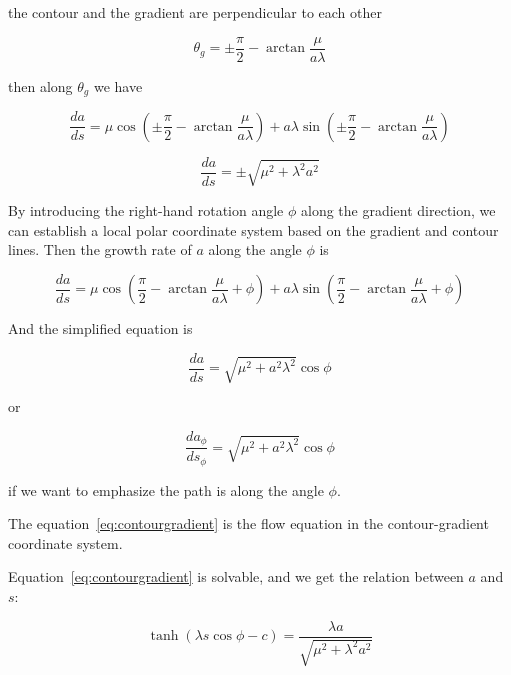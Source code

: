 \documentclass{article}
\numberwithin{definition}{section}
\numberwithin{lemma}{section}
\numberwithin{proposition}{section}
\numberwithin{corollary}{section}
\numberwithin{theorem}{section}
\begin{document}
the contour and the gradient are perpendicular to each other

\begin{equation}
    \theta_g = \pm \frac{\pi}{2} - \arctan \frac{\mu}{a \lambda}\label{eq:gradientangle}
\end{equation}

then along $\theta_g$ we have

\begin{equation}
    \frac{da}{ds} = \mu \cos (\pm \frac{\pi}{2} - \arctan \frac{\mu}{a \lambda}) + a \lambda \sin (\pm \frac{\pi}{2} - \arctan \frac{\mu}{a \lambda})
    \label{eq:alonggradient}
\end{equation}

\begin{equation}
    \frac{da}{ds} = \pm \sqrt{\mu^2 + \lambda^2 a^2}\label{eq:grad}
\end{equation}

By introducing the right-hand rotation angle $\phi$ along the gradient direction, we can establish a local polar coordinate system based on the gradient and contour lines.
Then the growth rate of $a$ along the angle $\phi$ is

\begin{equation}
    \frac{da}{ds} = \mu \cos (\frac{\pi}{2} - \arctan \frac{\mu}{a \lambda} + \phi) + a \lambda \sin (\frac{\pi}{2} - \arctan \frac{\mu}{a \lambda} + \phi)
    \label{eq:fourfold}
\end{equation}

And the simplified equation is

\begin{equation}
    \frac{da}{ds} = \sqrt {\mu^2 + a^2 \lambda^2} \cos \phi\label{eq:contourgradient}
\end{equation}

or

\begin{equation}
    \frac{da_{\phi}}{ds_{\phi}} = \sqrt {\mu^2 + a^2 \lambda^2} \cos \phi\label{eq:contourgradient2}
\end{equation}

if we want to emphasize the path is along the angle $\phi$.

The equation~\eqref{eq:contourgradient} is the flow equation in the contour-gradient coordinate system.

Equation~\eqref{eq:contourgradient} is solvable, and we get the relation between $a$ and $s$:

\begin{equation}\label{eq:rel_a_s}
\tanh(\lambda s \cos \phi - c) = \frac{\lambda a}{\sqrt{\mu^2 + \lambda^2 a^2}}
\end{equation}
\end{document}
